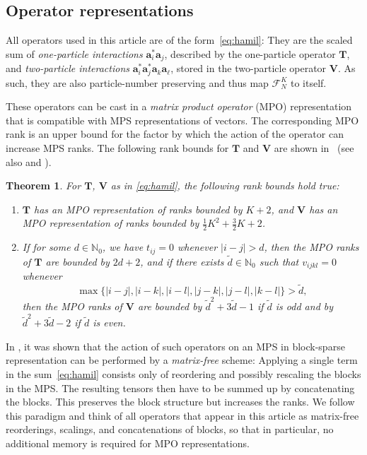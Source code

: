 \documentclass[a4paper,11pt,oneside]{amsart}
\providecommand{\abs}[1]{\lvert#1\rvert}
\newtheorem{theorem}{Theorem}
\theoremstyle{definition}
\theoremstyle{remark}
\newcommand{\cF}{{\mathcal{F}}}
\newcommand{\N}{\mathbb{N}}
\newcommand{\ten}[1]{\boldsymbol{#1}}
\numberwithin{equation}{section}
\numberwithin{theorem}{section}
\begin{document}
\subsection{Operator representations}

All operators used in this article are of the form~\eqref{eq:hamil}: They are the scaled sum of {\em one-particle interactions} $\ten{a}_{i}^\ast \ten{a}_j$, described by the one-particle operator $\ten T$, and {\em two-particle interactions} $\ten{a}_{i}^\ast \ten{a}_{j}^\ast \ten{a}_k \ten{a}_\ell$, stored in the two-particle operator $\ten V$. As such, they are also particle-number preserving and thus map $\cF^K_N$ to itself. 

%
These operators can be cast in a \emph{matrix product operator} (MPO) representation that is compatible with MPS representations of vectors. 
The corresponding MPO rank is an upper bound for the factor by which the action of the operator can increase MPS ranks.
%
The following rank bounds for $\ten T$ and $\ten V$ are shown in~\cite[Theorems~5.4,~5.5]{BGP:22} (see also \cite{dolgov2013two,kazeev2013low} and \cite{crosswhite2008finite,keller2015efficient}).

\begin{theorem}\label{thm:opranks}
For $\ten T$, $\ten V$ as in \eqref{eq:hamil}, the following rank bounds hold true:
\begin{enumerate}[{\rm\bf(i)}]
\item $\ten{T}$ has an MPO representation of ranks bounded by $K+2$, and $\ten V$ has an MPO representation of ranks bounded by $\frac12 {K^2}+ \frac32 {K}+2$.
\item If for some $d \in \N_0$, we have $ t_{ij} = 0$ whenever $\abs{i-j} > d$, then the MPO ranks of $\ten T$ are bounded by $2d+2$,
and if there exists $\tilde d\in\N_0$ such that $v_{i j k l} = 0$ whenever  \begin{equation*}
 \max\{ \abs{i-j},\abs{i-k},\abs{i-l},\abs{j-k},\abs{j-l},\abs{k-l}  \} > \tilde d,\end{equation*} 
 then the MPO ranks of $\ten{V}$ are bounded by $\tilde d^2+3\tilde d-1$ if $\tilde d$ is odd and by $\tilde d^2+3\tilde d-2$ if $\tilde d$ is even.
\end{enumerate}
\end{theorem}


In \cite{BGP:22}, it was shown that the action of such operators on an MPS in block-sparse representation can be performed by a \emph{matrix-free} scheme: Applying a single term in the sum~\eqref{eq:hamil} consists only of reordering and possibly rescaling the blocks in the MPS. The resulting tensors then have to be summed up by concatenating the blocks. This preserves the block structure but increases the ranks. We follow this paradigm and think of all operators that appear in this article as matrix-free reorderings, scalings, and concatenations of blocks, so that in particular, no additional memory is required for MPO representations.
\end{document}
